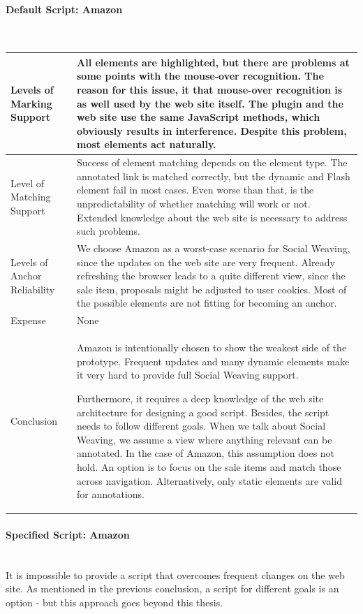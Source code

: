 \paragraph{Default Script: Amazon}\mbox{}\\
\begin{tabular}{|p{}| p{} |}
\hline 
Levels of Marking Support & All elements are highlighted, but there are problems at some points with the mouse-over recognition.  The reason for this issue, it that mouse-over recognition is as well used by the web site itself. The plugin and the web site use the same JavaScript methods, which obviously results in interference. Despite this problem, most elements act naturally. \\ 
\hline 
Level of Matching Support & Success of element matching depends on the element type. The annotated link is matched correctly, but the dynamic and Flash element fail in most cases. Even worse than that, is the unpredictability of whether matching will work or not. Extended knowledge about the web site is necessary to address such problems. \\ 
\hline 
Levels of Anchor Reliability & We choose Amazon as a worst-case scenario for Social Weaving, since the updates on the web site are very frequent. Already refreshing the browser leads to a quite different view, since the sale item, proposals might be adjusted to user cookies. Most of the possible elements are not fitting for becoming an anchor. \\ 
\hline 
Expense & None\\ 
\hline 
Conclusion & Amazon is intentionally chosen to show the weakest side of the prototype. Frequent updates and many dynamic elements make it very hard to provide full Social Weaving support. 

Furthermore, it requires a deep knowledge of the web site architecture for designing a good script. Besides, the script needs to follow different goals. When we talk about Social Weaving, we assume a view where anything relevant can be annotated. In the case of Amazon, this assumption does not hold. An option is to focus on the sale items and match those across navigation. Alternatively, only static elements are valid for annotations. \\ 
\hline 
\end{tabular} 
\paragraph{Specified Script: Amazon}\mbox{}\\
It is impossible to provide a script that overcomes frequent changes on the web site. As mentioned in the previous conclusion, a script for different goals is an option - but this approach goes beyond this thesis. 

